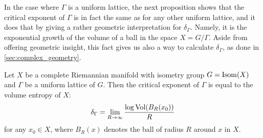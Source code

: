 \documentclass{report}
\begin{document}
In the case where $\Gamma$ is a uniform lattice, the next proposition shows that the critical exponent of $\Gamma$ is in fact the same as for any other uniform lattice, and it does that by giving a rather geometric interpretation for $\delta_\Gamma$.
Namely, it is the exponential growth of the volume of a ball in the space $X = G/\Gamma$.
Aside from offering geometric insight, this fact gives us also a way to calculate $\delta_\Gamma$, as done in \cref{sec:complex_geometry}.
\begin{lemma}\label{lem:critical_exponent_entropy}
    Let $X$ be a complete Riemannian manifold with isometry group $G= \operatorname{Isom}(X)$ and 
    $\Gamma$ be a uniform lattice of $G$.
    Then the critical exponent of $\Gamma$ is equal to the volume entropy of $X$:
    \[
    \delta_\Gamma = \lim_{R \to \infty} \frac{\log \operatorname{Vol}(B_R(x_0))}{R}
    \]
    for any $x_0 \in X$, where $B_R(x)$ denotes the ball of radius $R$ around $x$ in $X$.
\end{lemma}
\end{document}
